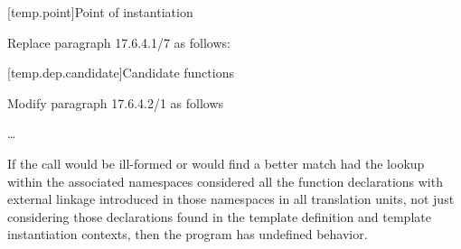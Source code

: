 [temp.point]{Point of instantiation}

\noindent
Replace paragraph 17.6.4.1/7 as follows:
\begin{std.txt}
   \resetalinea[6]
   \alinea
\end{std.txt}


[temp.dep.candidate]{Candidate functions}

\noindent
Modify paragraph 17.6.4.2/1 as follows
\begin{std.txt}
  \resetalinea[0]
  \alinea
  \ldots

  If the call would be ill-formed or would find a better match had the 
  lookup within the associated namespaces considered all the function 
  declarations with external   
  linkage introduced in those namespaces in all 
  translation units, not just considering those declarations found in the 
  template definition and template instantiation contexts, then the program 
  has undefined behavior.
\end{std.txt}



